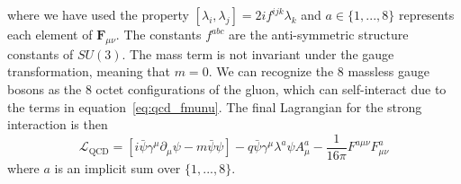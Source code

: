 where we have used the property $[\lambda_i,\lambda_j]=2if^{ijk}\lambda_k$ and $a\in\{1,...,8\}$ represents each element of $\mathbf{F}_{\mu\nu}$. The constants $f^{abc}$ are the anti-symmetric structure constants of $SU(3)$. The mass term is not invariant under the gauge transformation, meaning that $m=0$. We can recognize the 8 massless gauge bosons as the 8 octet configurations of the gluon, which can self-interact due to the terms in equation~\ref{eq:qcd_fmunu}. The final Lagrangian for the strong interaction is then
\begin{equation}
	\mathcal{L}_\text{QCD}=\left[i\bar{\psi}\gamma^\mu\partial_\mu\psi-m\bar{\psi}\psi\right]-q\bar{\psi}\gamma^\mu\lambda^a\psi A_\mu^a-\frac{1}{16\pi}F^{a\mu\nu}F^{a}_{\mu\nu}
\end{equation}
where $a$ is an implicit sum over $\{1,...,8\}$.

